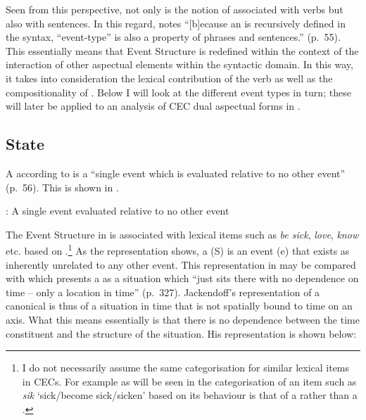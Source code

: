 Seen from this perspective, not only is the notion of 
associated with verbs but also with sentences.  In this regard,
\citet{Pustejovsky1991} notes ``[b]ecause an  is
recursively defined in the syntax, ``event-type” is also a property of
phrases and sentences.” (p.~55).  This essentially means that Event
Structure is redefined within the context of the interaction of other
aspectual elements within the syntactic domain.  In this way, it takes
into consideration the lexical contribution of the verb as well as the
compositionality of .  Below I will look at the different event
types in turn; these will later be applied to an analysis of CEC dual
aspectual forms in .

\subsection{State}\label{sec:4.2.2}

A  according to \citet{Pustejovsky1991} is a ``single event which
is evaluated relative to no other event” (p.~56).  This is shown in
.

\ea%
\label{ex:4:5}
: A single event evaluated relative to no other event \citep[56]{Pustejovsky1991}
\begin{center}\fbox{\parbox{3cm}{\centering
\begin{forest} [S [e]] \end{forest}
}} 
\end{center}\z

The Event Structure in  is associated with lexical
items such as \textit{be sick},  \textit{love}, \textit{know} etc. based on
\citet{Pustejovsky1991}.\footnote{I do not necessarily assume the same
  categorisation for similar lexical items in CECs. For example as
  will be seen in  the categorisation of an item such
  as \textit{sik} `sick\slash become sick\slash sicken' based on its behaviour is
  that of a  rather than a .}  As the representation
shows, a  (S) is an event (e) that exists as inherently unrelated
to any other event.  This representation in  may be
compared with \citet{Jackendoff1996} which presents a  as a
situation which ``just sits there with no dependence on time -- only a
location in time” (p.~327).  Jackendoff’s representation of a
canonical  is thus of a situation in time that is not spatially
bound to time on an axis.  What this means essentially is that there
is no dependence between the time constituent and the structure of the
situation.  His representation is shown below:

